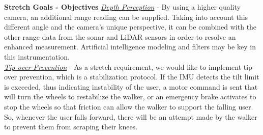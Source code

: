 \noindent \textbf{Stretch Goals - Objectives} \newline
\noindent \underline{\textit{Depth Perception}} - By using a higher quality camera, an additional range reading can be supplied. Taking into account this different angle and the camera’s unique perspective, it can be combined with the other range data from the sonar and LiDAR sensors in order to resolve an enhanced measurement. Artificial intelligence modeling and filters may be key in this instrumentation. \\

\noindent \underline{\textit{Tip-over Prevention}} - As a stretch requirement, we would like to implement tip-over prevention, which is a stabilization protocol. If the IMU detects the tilt limit is exceeded, thus indicating instability of the user, a motor command is sent that will turn the wheels to restabilize the walker, or an emergency brake activates to stop the wheels so that friction can allow the walker to support the falling user. So, whenever the user falls forward, there will be an attempt made by the walker to prevent them from scraping their knees. \\
